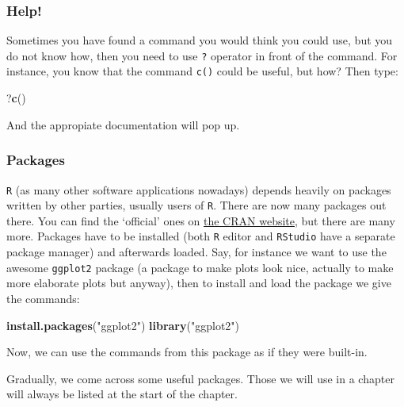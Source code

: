 \documentclass[]{article}
\newenvironment{Shaded}{\begin{snugshade}}{\end{snugshade}}
\newcommand{\KeywordTok}[1]{\textcolor[rgb]{0.13,0.29,0.53}{\textbf{{#1}}}}
\newcommand{\StringTok}[1]{\textcolor[rgb]{0.31,0.60,0.02}{{#1}}}
\newcommand{\NormalTok}[1]{{#1}}
\begin{document}
\subsubsection{Help!}\label{help}

Sometimes you have found a command you would think you could use, but
you do not know how, then you need to use \texttt{?} operator in front
of the command. For instance, you know that the command \texttt{c()}
could be useful, but how? Then type:

\begin{Shaded}
\begin{Highlighting}[]
\NormalTok{?}\KeywordTok{c}\NormalTok{()}
\end{Highlighting}
\end{Shaded}

And the appropiate documentation will pop up.

\subsubsection{Packages}\label{subsec:packages}

\texttt{R} (as many other software applications nowadays) depends
heavily on packages written by other parties, usually users of
\texttt{R}. There are now many packages out there. You can find the
`official' ones on
\href{https://cran.r-project.org/web/packages/available_packages_by_name.html}{the
CRAN website}, but there are many more. Packages have to be installed
(both \texttt{R} editor and \texttt{RStudio} have a separate package
manager) and afterwards loaded. Say, for instance we want to use the
awesome \texttt{ggplot2} package (a package to make plots look nice,
actually to make more elaborate plots but anyway), then to install and
load the package we give the commands:

\begin{Shaded}
\begin{Highlighting}[]
\KeywordTok{install.packages}\NormalTok{(}\StringTok{"ggplot2"}\NormalTok{)}
\KeywordTok{library}\NormalTok{(}\StringTok{"ggplot2"}\NormalTok{)}
\end{Highlighting}
\end{Shaded}

Now, we can use the commands from this package as if they were built-in.

Gradually, we come across some useful packages. Those we will use in a
chapter will always be listed at the start of the chapter.
\end{document}
